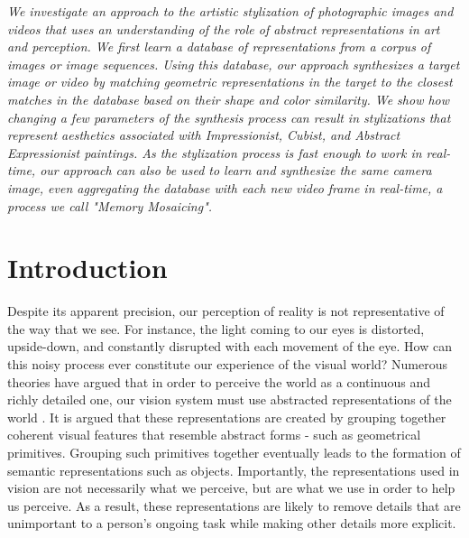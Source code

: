 \documentclass[a4paper,11pt,final]{ThesisStyle}
\newenvironment{abstract}{\rightskip1in\itshape}{}
\begin{document}
\begin{abstract}
We investigate an approach to the artistic stylization of photographic images and videos that uses an understanding of the role of abstract representations in art and perception.  We first learn a database of representations from a corpus of images or image sequences.  Using this database, our approach synthesizes a target image or video by matching geometric representations in the target to the closest matches in the database based on their shape and color similarity.  We show how changing a few parameters of the synthesis process can result in stylizations that represent aesthetics associated with Impressionist, Cubist, and Abstract Expressionist paintings.  As the stylization process is fast enough to work in real-time, our approach can also be used to learn and synthesize the same camera image, even aggregating the database with each new video frame in real-time, a process we call "Memory Mosaicing". 

\end{abstract}

\section{Introduction}  
Despite its apparent precision, our perception of reality is not representative of the way that we see.  For instance, the light coming to our eyes is distorted, upside-down, and constantly disrupted with each movement of the eye.  How can this noisy process ever constitute our experience of the visual world?  Numerous theories have argued that in order to perceive the world as a continuous and richly detailed one, our vision system must use abstracted representations of the world \cite{Marr1982}.  It is argued that these representations are created by grouping together coherent visual features that resemble abstract forms - such as geometrical primitives. Grouping such primitives together eventually leads to the formation of semantic representations such as objects. Importantly, the representations used in vision are not necessarily what we perceive, but are what we use in order to help us perceive. As a result, these representations are likely to remove details that are unimportant to a person's ongoing task while making other details more explicit.
\end{document}
